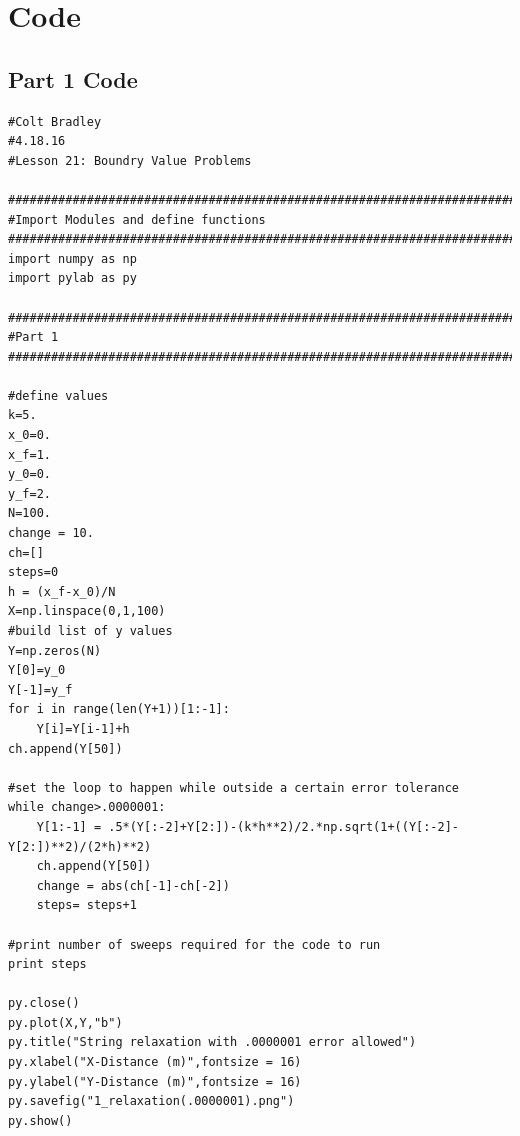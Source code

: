 \documentclass[11pt]{article}
\begin{document}
\section{Code}
\subsection{Part 1 Code}
\begin{verbatim}
#Colt Bradley
#4.18.16
#Lesson 21: Boundry Value Problems

###############################################################################
#Import Modules and define functions
###############################################################################
import numpy as np
import pylab as py

###############################################################################
#Part 1
###############################################################################

#define values
k=5.
x_0=0.
x_f=1.
y_0=0.
y_f=2.
N=100.
change = 10.
ch=[]
steps=0
h = (x_f-x_0)/N
X=np.linspace(0,1,100)
#build list of y values
Y=np.zeros(N)
Y[0]=y_0
Y[-1]=y_f
for i in range(len(Y+1))[1:-1]:
    Y[i]=Y[i-1]+h
ch.append(Y[50])

#set the loop to happen while outside a certain error tolerance
while change>.0000001:    
    Y[1:-1] = .5*(Y[:-2]+Y[2:])-(k*h**2)/2.*np.sqrt(1+((Y[:-2]-Y[2:])**2)/(2*h)**2)
    ch.append(Y[50])
    change = abs(ch[-1]-ch[-2])
    steps= steps+1

#print number of sweeps required for the code to run
print steps

py.close()
py.plot(X,Y,"b")
py.title("String relaxation with .0000001 error allowed")
py.xlabel("X-Distance (m)",fontsize = 16)
py.ylabel("Y-Distance (m)",fontsize = 16)
py.savefig("1_relaxation(.0000001).png")
py.show()
\end{verbatim}
\end{document}
